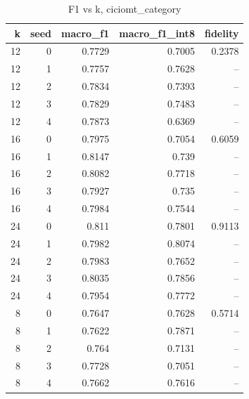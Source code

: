 \begin{table}
\caption{F1 vs k, ciciomt_category}
\begin{tabular}{rrrrr}
\toprule
k & seed & macro_f1 & macro_f1_int8 & fidelity \\
\midrule
12 & 0 & 0.7729 & 0.7005 & 0.2378 \\
12 & 1 & 0.7757 & 0.7628 & -- \\
12 & 2 & 0.7834 & 0.7393 & -- \\
12 & 3 & 0.7829 & 0.7483 & -- \\
12 & 4 & 0.7873 & 0.6369 & -- \\
16 & 0 & 0.7975 & 0.7054 & 0.6059 \\
16 & 1 & 0.8147 & 0.739 & -- \\
16 & 2 & 0.8082 & 0.7718 & -- \\
16 & 3 & 0.7927 & 0.735 & -- \\
16 & 4 & 0.7984 & 0.7544 & -- \\
24 & 0 & 0.811 & 0.7801 & 0.9113 \\
24 & 1 & 0.7982 & 0.8074 & -- \\
24 & 2 & 0.7983 & 0.7652 & -- \\
24 & 3 & 0.8035 & 0.7856 & -- \\
24 & 4 & 0.7954 & 0.7772 & -- \\
8 & 0 & 0.7647 & 0.7628 & 0.5714 \\
8 & 1 & 0.7622 & 0.7871 & -- \\
8 & 2 & 0.764 & 0.7131 & -- \\
8 & 3 & 0.7728 & 0.7051 & -- \\
8 & 4 & 0.7662 & 0.7616 & -- \\
\bottomrule
\end{tabular}
\end{table}
